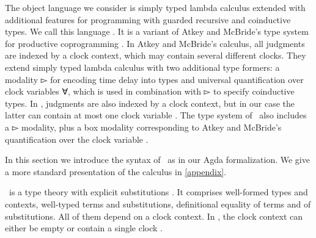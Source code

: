
The object language we consider is simply typed lambda calculus
extended with additional features for programming with guarded recursive and coinductive
types. We call this language \GTT. It is a variant of Atkey and McBride's type system %
for
productive coprogramming \cite{atkey2013productive}. In Atkey and McBride's calculus, all judgments are indexed by a clock context,
which may contain several different clocks. They extend simply typed
lambda calculus with two additional type formers: a modality ▻ for
encoding time delay into types and universal quantification over clock
variables ∀, which is used in combination with ▻ to specify coinductive types.
In \GTT, judgments are also indexed by a clock context, but in our case the latter can contain at most one clock variable . The type system of \GTT\ also includes a ▻ modality, plus a box modality corresponding to Atkey and McBride's quantification over the clock variable .


In this section we introduce the syntax of \GTT\ as in our Agda formalization. We give a more standard presentation of the calculus in \cref{appendix}.

\GTT\ is a type theory with explicit substitutions \cite{AbadiCCL91}. It comprises
well-formed types and contexts, well-typed terms and substitutions,
definitional equality of terms and of substitutions. All of them depend on a clock context.
In \GTT, the clock context can either be empty or contain a single clock .

